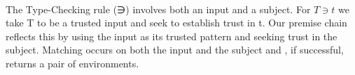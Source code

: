 {\begin{code}
\AgdaSymbol{(}\AgdaSpace{}%
\AgdaSymbol{)}\AgdaSpace{}%
\AgdaSymbol{(}\AgdaSpace{}%
\AgdaSymbol{)}\AgdaSpace{}%
\AgdaSymbol{=}\AgdaSpace{}%
\AgdaSpace{}%
\AgdaSpace{}%
\AgdaSymbol{(}\AgdaSpace{}%
\AgdaSpace{}%
\AgdaSpace{}%
\AgdaSymbol{(}\AgdaSpace{}%
\AgdaSymbol{))}\<%
\\
\>[0]\AgdaSpace{}%
\AgdaSymbol{(}\AgdaSpace{}%
\AgdaSymbol{)}\AgdaSpace{}%
\AgdaSymbol{(}\AgdaSpace{}%
\AgdaSymbol{)}\AgdaSpace{}%
\AgdaSymbol{(}\AgdaSpace{}%
\AgdaSymbol{(}\AgdaSpace{}%
\AgdaOperator{\AgdaInductiveConstructor{,}}\AgdaSpace{}%
\AgdaSymbol{))}\AgdaSpace{}%
\AgdaSymbol{=}\AgdaSpace{}%
\AgdaSpace{}%
\AgdaSpace{}%
\AgdaSymbol{(}\AgdaSpace{}%
\AgdaSpace{}%
\AgdaSpace{}%
\AgdaSymbol{(}\AgdaSpace{}%
\AgdaSymbol{(}\AgdaSpace{}%
\AgdaOperator{\AgdaInductiveConstructor{,}}\AgdaSpace{}%
\AgdaSpace{}%
\AgdaSpace{}%
\AgdaSpace{}%
\AgdaSpace{}%
\AgdaSymbol{(}\AgdaSpace{}%
\AgdaSpace{}%
\AgdaSymbol{)))))}\<%
\end{code}
}
The Type-Checking rule (∋) involves both an input and a subject. For
$T ∋ t$ we take T to be a trusted input and seek to establish trust
in t. Our premise chain reflects this by using the input as its
trusted pattern and seeking trust in the subject. Matching occurs on
both the input and the subject and , if successful, returns a
pair of environments.
\begin{code}%
\>[0]\AgdaSpace{}%
\AgdaSpace{}%
\AgdaSymbol{:}\AgdaSpace{}%
\AgdaSpace{}%
\<%
\\
\>[0][@{}l@{\AgdaIndent{0}}]%
\>[2]\<%
\\
\>[2][@{}l@{\AgdaIndent{0}}]%
\>[4]%
\>[13]\AgdaSymbol{:}\AgdaSpace{}%
\AgdaSpace{}%
\<%
\\
%
\>[4]%
\>[13]\AgdaSymbol{:}\AgdaSpace{}%
\AgdaSpace{}%
\<%
\\
%
\>[4]\AgdaSpace{}%
\AgdaSymbol{:}\AgdaSpace{}%
\AgdaFunction{Σ[}\AgdaSpace{}%
\AgdaSpace{}%
\AgdaSpace{}%
\AgdaSpace{}%
\AgdaSpace{}%
\AgdaFunction{]}\AgdaSpace{}%
\AgdaSpace{}%
\AgdaSpace{}%
\AgdaSpace{}%
\<%
\\
\>[0]\AgdaSpace{}%
\<%
\end{code}
